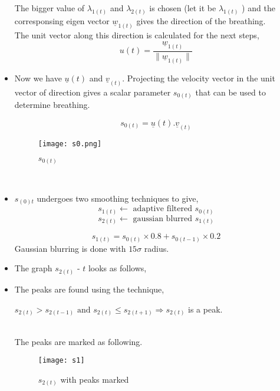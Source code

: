 \documentclass{report}
\begin{document}
\begin{itemize}
    The bigger value of $\lambda_{1(t)}$ and $\lambda_{2(t)}$ is chosen (let it be $\lambda_{1(t)}$ ) and the corresponsing eigen vector $\underline{w}_{1(t)}$ gives the direction of the breathing.\\
    
    The unit vector along this direction is calculated for the next steps,\\
    $$u{(t)}=\frac{\underline{w}_{1(t)}}{\|{\underline{w}_{1(t)}}\|}$$
    
    \item Now we have $\underline{u}{(t)}$ and $\underline{v}_{(t)}$. Projecting the velocity vector in the unit vector of direction gives a scalar parameter $s_{0(t)}$ that can be used to determine breathing.
    
    $$s_{0(t)}=\underline{u}{(t)} . \underline{v}_{(t)}$$
    
    \begin{figure}[H]
        \centering
        \texttt{[image: s0.png]}
        \caption{$s_{0(t)}$}
        \label{fig:my_label}
    \end{figure}\\
    
    \item $s_{(0)t}$ undergoes two smoothing techniques to give,
    $$s_{1(t)} \leftarrow \textrm{ adaptive filtered } s_{0(t)} $$
    $$s_{2(t)} \leftarrow \textrm{ gaussian blurred } s_{1(t)} $$
    
    $$s_{1(t)}=s_{0(t)}\times 0.8 + s_{0(t-1)}\times0.2 $$
    Gaussian blurring is done with $15\sigma$ radius.\\
    
    \item The graph $s_{2(t)} \textrm{ - } t $ looks as follows,\\
    
    \item The peaks are found using the technique,
    \begin{center} $s_{2(t)}>s_{2(t-1)} \textrm{ and } s_{2(t)} \leq s_{2(t+1)} \Rightarrow s_{2(t)} $ is a peak.\end{center}\\
    The peaks are marked as following.\\
    
    \begin{figure}[H]
        \centering
        \texttt{[image: s1]}
        \caption{$s_{2(t)}$ with peaks marked}
        \label{fig:my_label}
    \end{figure}\\
   

\end{itemize}
\end{document}
